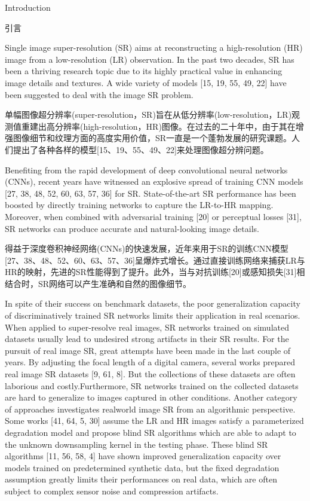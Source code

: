 Introduction

引言

Single image super-resolution (SR) aims at reconstructing a high-resolution (HR) image from a low-resolution (LR) observation. In the past two decades, SR has been a thriving research topic due to its highly practical value in enhancing image details and textures. A wide variety of models [15, 19, 55, 49, 22] have been suggested to deal with the image SR problem.

单幅图像超分辨率(super-resolution，SR)旨在从低分辨率(low-resolution，LR)观测值重建出高分辨率(high-resolution，HR)图像。在过去的二十年中，由于其在增强图像细节和纹理方面的高度实用价值，SR一直是一个蓬勃发展的研究课题。人们提出了各种各样的模型[15、19、55、49、22]来处理图像超分辨问题。

Benefiting from the rapid development of deep convolutional neural networks (CNNs), recent years have witnessed an explosive spread of training CNN models [27, 38, 48, 52, 60, 63, 57, 36] for SR. State-of-the-art SR performance has been boosted by directly training networks to capture the LR-to-HR mapping. Moreover, when combined with adversarial training [20] or perceptual losses [31], SR networks can produce accurate and natural-looking image details.

得益于深度卷积神经网络(CNNs)的快速发展，近年来用于SR的训练CNN模型[27、38、48、52、60、63、57、36]呈爆炸式增长。通过直接训练网络来捕获LR与HR的映射，先进的SR性能得到了提升。此外，当与对抗训练[20]或感知损失[31]相结合时，SR网络可以产生准确和自然的图像细节。

In spite of their success on benchmark datasets, the poor generalization capacity of discriminatively trained SR networks limits their application in real scenarios. When applied to super-resolve real images, SR networks trained on simulated datasets usually lead to undesired strong artifacts in their SR results. For the pursuit of real image SR, great attempts have been made in the last couple of years. By adjusting the focal length of a digital camera, several works prepared real image SR datasets [9, 61, 8]. But the collections of these datasets are often laborious and costly.Furthermore, SR networks trained on the collected datasets are hard to generalize to images captured in other conditions. Another category of approaches investigates realworld image SR from an algorithmic perspective. Some works [41, 64, 5, 30] assume the LR and HR images satisfy a parameterized degradation model and propose blind SR algorithms which are able to adapt to the unknown downsampling kernel in the testing phase. These blind SR algorithms [11, 56, 58, 4] have shown improved generalization capacity over models trained on predetermined synthetic data, but the fixed degradation assumption greatly limits their performances on real data, which are often subject to complex sensor noise and compression artifacts.

